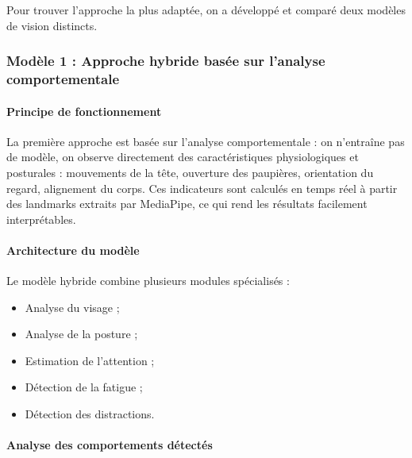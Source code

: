 Pour trouver l’approche la plus adaptée, on a développé et comparé deux modèles de vision distincts.

\subsubsection{Modèle 1 : Approche hybride basée sur l’analyse comportementale}

\paragraph{Principe de fonctionnement}

La première approche est basée sur l’analyse comportementale : on n’entraîne pas de modèle, on observe directement des caractéristiques physiologiques et posturales : mouvements de la tête, ouverture des paupières, orientation du regard, alignement du corps. Ces indicateurs sont calculés en temps réel à partir des landmarks extraits par MediaPipe, ce qui rend les résultats facilement interprétables.


\paragraph{Architecture du modèle}

Le modèle hybride combine plusieurs modules spécialisés :

\begin{itemize}
    \item Analyse du visage ;
    
    \item Analyse de la posture ;
    
    \item Estimation de l’attention ;
    
    \item Détection de la fatigue ;
    
    \item Détection des distractions.
\end{itemize}


\paragraph{Analyse des comportements détectés}

